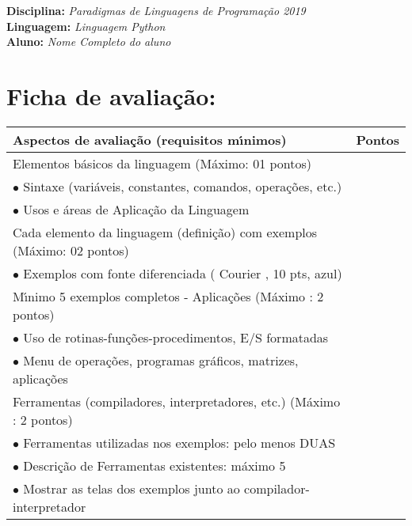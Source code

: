 

\noindent
\textbf{Disciplina:} \textit{Paradigmas de Linguagens de Programa\c{c}\~{a}o 2019}\\
\textbf{Linguagem:} \textit{Linguagem Python}\\
\textbf{Aluno:} \textit{Nome Completo do aluno}


\section*{Ficha de avalia\c{c}\~{a}o:}



\begin{tabular}{|p{12cm}|c|}
  \hline
  \textbf{Aspectos de avalia\c{c}\~{a}o (requisitos m\'{\i}nimos)} & \textbf{Pontos} \\
  \hline
  Elementos b\'{a}sicos da linguagem (M\'{a}ximo: 01 pontos) &  \\
  $\bullet$ Sintaxe (vari\'{a}veis, constantes, comandos, opera\c{c}\~{o}es, etc.) &  \\
  $\bullet$ Usos e \'{a}reas de Aplica\c{c}\~{a}o da Linguagem &  \\
  \hline
  Cada elemento da linguagem (defini\c{c}\~{a}o) com exemplos (M\'{a}ximo: 02 pontos) &  \\
  $\bullet$ Exemplos com fonte diferenciada ( Courier , 10 pts, azul) & \\
  \hline
  M\'{\i}nimo 5 exemplos completos - Aplica\c{c}\~{o}es (M\'{a}ximo : 2 pontos) &  \\
  $\bullet$ Uso de rotinas-fun\c{c}\~{o}es-procedimentos, E/S formatadas &  \\
  $\bullet$ Menu de opera\c{c}\~{o}es, programas gr\'{a}ficos, matrizes, aplica\c{c}\~{o}es &  \\
  \hline
  Ferramentas (compiladores, interpretadores, etc.) (M\'{a}ximo : 2 pontos) &  \\
  $\bullet$ Ferramentas utilizadas nos exemplos: pelo menos DUAS&  \\
  $\bullet$ Descri\c{c}\~{a}o de Ferramentas existentes:  m\'{a}ximo 5&  \\
  $\bullet$ Mostrar as telas dos exemplos junto ao compilador-interpretador&  \\

\end{tabular}
